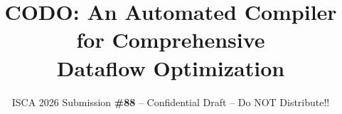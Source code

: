 \documentclass[conference]{IEEEtran}
\begin{document}
\pdfpagewidth=8.5in
\pdfpageheight=11in

\newcommand{\iscasubmissionnumber}{NaN}


\title{CODO: An Automated Compiler for Comprehensive \\
Dataflow Optimization}
\author{\normalsize{ISCA 2026 Submission
    \textbf{\#88} -- Confidential Draft -- Do NOT Distribute!!}}




\end{document}
